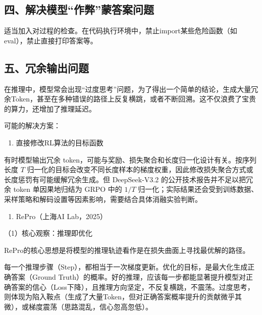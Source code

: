 \hypertarget{ux56dbux89e3ux51b3ux6a21ux578bux4f5cux5f0aux8499ux7b54ux6848ux95eeux9898}{%
\subsection{四、解决模型``作弊''蒙答案问题}\label{ux56dbux89e3ux51b3ux6a21ux578bux4f5cux5f0aux8499ux7b54ux6848ux95eeux9898}}

适当加入对过程的检查。在代码执行环境中，禁止import某些危险函数（如eval），禁止直接打印答案等。

\hypertarget{ux4e94ux5197ux4f59ux8f93ux51faux95eeux9898}{%
\subsection{五、冗余输出问题}\label{ux4e94ux5197ux4f59ux8f93ux51faux95eeux9898}}

在推理中，模型常会出现``过度思考''问题，为了得出一个简单的结论，生成大量冗余Token，甚至在多种错误的路径上反复横跳，或者不断回溯。这不仅浪费了宝贵的算力，还增加了推理延迟。

可能的解决方案：

\begin{enumerate}
\def\labelenumi{\arabic{enumi}.}
\tightlist
\item
  直接修改RL算法的目标函数
\end{enumerate}

有时模型输出冗余 token，可能与奖励、损失聚合和长度归一化设计有关。按序列长度 \(T\) 归一化的目标会改变不同长度样本的梯度权重，因此修改损失聚合方式或长度惩罚有可能缓解冗余生成。但 DeepSeek-V3.2 的公开技术报告并不足以把冗余 token 单因果地归结为 GRPO 中的 \(1/T\) 归一化；实际结果还会受到训练数据、采样策略和解码设置等因素影响，需要结合具体消融实验判断。

\begin{enumerate}
\def\labelenumi{\arabic{enumi}.}
\setcounter{enumi}{1}
\tightlist
\item
  RePro（上海AI Lab，2025）
\end{enumerate}

（1）核心观察：推理即优化

RePro的核心思想是将模型的推理轨迹看作是在损失曲面上寻找最优解的路径。

每一个推理步骤（Step），都相当于一次梯度更新。优化的目标，是最大化生成正确答案（Ground Truth）的概率。好的推理，应该每一步都能显著提升模型对正确答案的信心（Loss下降），且推理方向坚定，不反复横跳，不震荡。过度思考，则体现为陷入鞍点（生成了大量Token，但对正确答案概率提升的贡献微乎其微），或梯度震荡（思路混乱，信心忽高忽低）。

